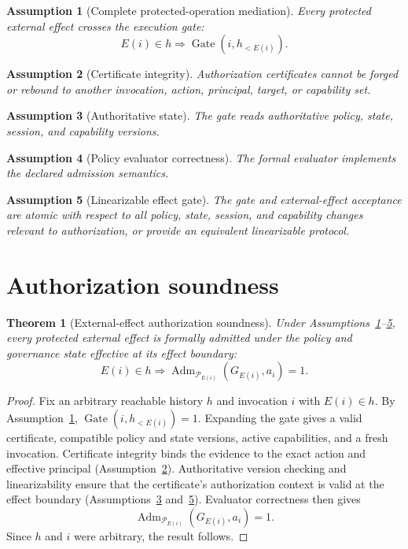 \documentclass[11pt,a4paper]{article}
\newtheorem{assumption}{Assumption}[section]
\newtheorem{theorem}{Theorem}[section]
\theoremstyle{remark}
\newcommand{\Adm}{\operatorname{Adm}}
\newcommand{\Gate}{\operatorname{Gate}}
\begin{document}
\begin{assumption}[Complete protected-operation mediation]\label{a:gate}
Every protected external effect crosses the execution gate:
\[
E(i)\in h\Rightarrow \Gate(i,h_{<E(i)}).
\]
\end{assumption}

\begin{assumption}[Certificate integrity]\label{a:cert}
Authorization certificates cannot be forged or rebound to another invocation, action, principal, target, or capability set.
\end{assumption}

\begin{assumption}[Authoritative state]\label{a:state}
The gate reads authoritative policy, state, session, and capability versions.
\end{assumption}

\begin{assumption}[Policy evaluator correctness]\label{a:sem}
The formal evaluator implements the declared admission semantics.
\end{assumption}

\begin{assumption}[Linearizable effect gate]\label{a:atomic}
The gate and external-effect acceptance are atomic with respect to all policy, state, session, and capability changes relevant to authorization, or provide an equivalent linearizable protocol.
\end{assumption}

\section{Authorization soundness}

\begin{theorem}[External-effect authorization soundness]\label{thm:auth}
Under Assumptions~\ref{a:gate}--\ref{a:atomic}, every protected external effect is formally admitted under the policy and governance state effective at its effect boundary:
\[
E(i)\in h\Rightarrow
\Adm_{\mathcal P_{E(i)}}(G_{E(i)},a_i)=1.
\]
\end{theorem}

\begin{proof}
Fix an arbitrary reachable history $h$ and invocation $i$ with $E(i)\in h$. By Assumption~\ref{a:gate}, $\Gate(i,h_{<E(i)})=1$. Expanding the gate gives a valid certificate, compatible policy and state versions, active capabilities, and a fresh invocation. Certificate integrity binds the evidence to the exact action and effective principal (Assumption~\ref{a:cert}). Authoritative version checking and linearizability ensure that the certificate's authorization context is valid at the effect boundary (Assumptions~\ref{a:state} and~\ref{a:atomic}). Evaluator correctness then gives
\[
\Adm_{\mathcal P_{E(i)}}(G_{E(i)},a_i)=1.
\]
Since $h$ and $i$ were arbitrary, the result follows.
\end{proof}
\end{document}
